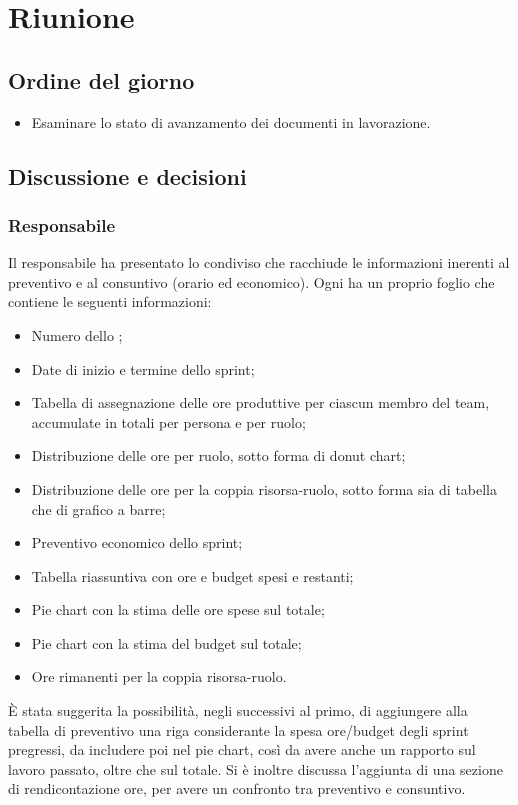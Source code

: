 \section{Riunione}
\subsection{Ordine del giorno}
\begin{itemize}
	\item Esaminare lo stato di avanzamento dei documenti in lavorazione.
\end{itemize}

\subsection{Discussione e decisioni}

\subsubsection{Responsabile}
\par Il responsabile ha presentato lo  condiviso che racchiude le informazioni inerenti al preventivo e al consuntivo (orario ed economico). Ogni  ha un proprio foglio che contiene le seguenti informazioni:
\begin{itemize}
	\item Numero dello ;
	\item Date di inizio e termine dello sprint;
	\item Tabella di assegnazione delle ore produttive per ciascun membro del team, accumulate in totali per persona e per ruolo;
	\item Distribuzione delle ore per ruolo, sotto forma di donut chart;
	\item Distribuzione delle ore per la coppia risorsa-ruolo, sotto forma sia di tabella che di grafico a barre;
	\item Preventivo economico dello sprint;
	\item Tabella riassuntiva con ore e budget spesi e restanti;
	\item Pie chart con la stima delle ore spese sul totale;
	\item Pie chart con la stima del budget sul totale;
	\item Ore rimanenti per la coppia risorsa-ruolo.
\end{itemize}

\vspace{0.5\baselineskip}
\par È stata suggerita la possibilità, negli  successivi al primo, di aggiungere alla tabella di preventivo una riga considerante la spesa ore/budget degli sprint pregressi, da includere poi nel pie chart, così da avere anche un rapporto sul lavoro passato, oltre che sul totale. Si è inoltre discussa l'aggiunta di una sezione di rendicontazione ore, per avere un confronto tra preventivo e consuntivo.

